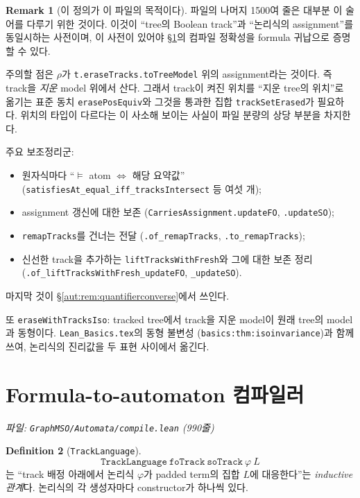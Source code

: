 \documentclass[11pt]{article}
\theoremstyle{definition}
\newtheorem{definition}{Definition}[section]
\newtheorem{remark}[definition]{Remark}
\theoremstyle{plain}
\newcommand{\lean}[1]{\texttt{#1}}
\newcommand{\leanfile}[1]{\texttt{#1}}
\begin{document}
\begin{remark}[이 정의가 이 파일의 목적이다]
\label{aut:rem:carriespoint}
파일의 나머지 1500여 줄은 대부분 이 술어를 다루기 위한 것이다. 이것이
``tree의 Boolean track''과 ``논리식의 assignment''를 동일시하는 사전이며,
이 사전이 있어야 \S\ref{aut:sec:compile}의 컴파일 정확성을 formula 귀납으로
증명할 수 있다.

주의할 점은 $\rho$가 \lean{t.eraseTracks.toTreeModel} 위의 assignment라는 것이다.
즉 track을 \emph{지운} model 위에서 산다. 그래서 track이 켜진 위치를
``지운 tree의 위치''로 옮기는 표준 동치 \lean{erasePosEquiv}와 그것을 통과한
집합 \lean{trackSetErased}가 필요하다. 위치의 타입이 다르다는 이 사소해
보이는 사실이 파일 분량의 상당 부분을 차지한다.

주요 보조정리군:
\begin{itemize}
  \item 원자식마다 ``$\models$ atom $\iff$ 해당 요약값''
    (\lean{satisfiesAt\_equal\_iff\_tracksIntersect} 등 여섯 개);
  \item assignment 갱신에 대한 보존
    (\lean{CarriesAssignment.updateFO}, \lean{.updateSO});
  \item \lean{remapTracks}를 건너는 전달
    (\lean{.of\_remapTracks}, \lean{.to\_remapTracks});
  \item 신선한 track을 추가하는 \lean{liftTracksWithFresh}와 그에 대한
    보존 정리 (\lean{.of\_liftTracksWithFresh\_updateFO}, \lean{\_updateSO}).
\end{itemize}
마지막 것이 \S\ref{aut:rem:quantifierconverse}에서 쓰인다.
\end{remark}

또 \lean{eraseWithTracksIso}: tracked tree에서 track을 지운 model이 원래
tree의 model과 동형이다. \leanfile{Lean\_Basics.tex}의 동형 불변성
(\lean{basics:thm:isoinvariance})과 함께 쓰여, 논리식의 진리값을 두 표현
사이에서 옮긴다.

\section{Formula-to-automaton 컴파일러}
\label{aut:sec:compile}

\emph{파일: \leanfile{GraphMSO/Automata/compile.lean} (990줄)}

\begin{definition}[\lean{TrackLanguage}]
\label{aut:def:tracklanguage}
\[
  \lean{TrackLanguage}\ \lean{foTrack}\ \lean{soTrack}\ \varphi\ L
\]
는 ``track 배정 아래에서 논리식 $\varphi$가 padded term의 집합 $L$에
대응한다''는 \emph{inductive 관계}다. 논리식의 각 생성자마다 constructor가
하나씩 있다.
\end{definition}
\end{document}

